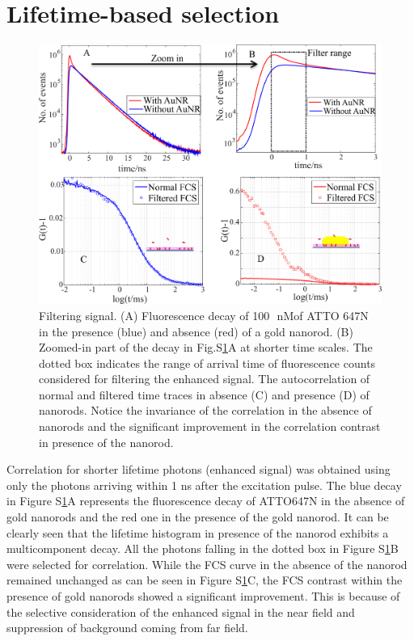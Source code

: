 \documentclass[11pt,a4paper,onecolumn]{article}
\newcommand{\nM}{\ensuremath{\,\textrm{nM}}}
\begin{document}
\section{Lifetime-based selection}
\begin{figure}[ht]
  \centering
  \includegraphics[width=\textwidth]{lifetime_filtering.png}
  \makeatletter
  \renewcommand{\fnum@figure}{\figurename~S\thefigure}
  \makeatother{}
  \caption{Filtering signal. (A) Fluorescence decay of 100~\nM of ATTO 647N in the presence (blue) and absence (red) of a gold nanorod. (B) Zoomed-in part of the decay in Fig.S\ref{SIfig:lifetime-filtering}A at shorter time scales. The dotted box indicates the range of arrival time of fluorescence counts considered for filtering the enhanced signal. The autocorrelation of normal and filtered time traces in absence (C) and presence (D) of nanorods. Notice the invariance of the correlation in the absence of nanorods and the significant improvement in the correlation contrast in presence of the nanorod.}
  \label{SIfig:lifetime-filtering}
\end{figure}
Correlation for shorter lifetime photons (enhanced signal) was obtained using only the photons arriving within 1 ns after the excitation pulse. The blue decay in Figure S\ref{SIfig:lifetime-filtering}A represents the fluorescence decay of ATTO647N in the absence of gold nanorods and the red one in the presence of the gold nanorod. It can be clearly seen that the lifetime histogram in presence of the nanorod exhibits a multicomponent decay. All the photons falling in the dotted box in Figure S\ref{SIfig:lifetime-filtering}B were selected for correlation. While the FCS curve in the absence of the nanorod remained unchanged as can be seen in Figure S\ref{SIfig:lifetime-filtering}C, the FCS contrast within the presence of gold nanorods showed a significant improvement. This is because of the selective consideration of the enhanced signal in the near field and suppression of background coming from far field.
\end{document}
